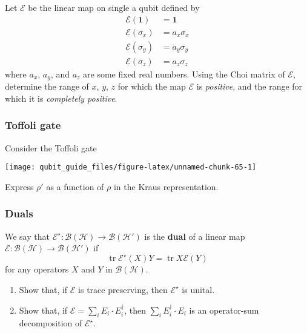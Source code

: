 \documentclass[fleqn]{article}
\providecommand{\tightlist}{%
  \setlength{\itemsep}{0pt}\setlength{\parskip}{0pt}}
\begin{document}
Let \(\mathcal{E}\) be the linear map on single a qubit defined by
\[
  \begin{aligned}
    \mathcal{E}(\mathbf{1})
    &= \mathbf{1}
  \\\mathcal{E}(\sigma_x)
    &= a_x\sigma_x
  \\\mathcal{E}(\sigma_y)
    &= a_y\sigma_y
  \\\mathcal{E}(\sigma_z)
    &= a_z\sigma_z
  \end{aligned}
\]
where \(a_x\), \(a_y\), and \(a_z\) are some fixed real numbers.
Using the Choi matrix of \(\mathcal{E}\), determine the range of \(x\), \(y\), \(z\) for which the map \(\mathcal{E}\) is \emph{positive}, and the range for which it is \emph{completely positive}.

\hypertarget{toffoli-gate}{%
\subsubsection{Toffoli gate}\label{toffoli-gate}}

Consider the Toffoli gate

\begin{center}\texttt{[image: qubit\_guide\_files/figure-latex/unnamed-chunk-65-1]} \end{center}

Express \(\rho'\) as a function of \(\rho\) in the Kraus representation.

\hypertarget{duals}{%
\subsubsection{Duals}\label{duals}}

We say that \(\mathcal{E}^\star\colon\mathcal{B}(\mathcal{H})\to\mathcal{B}(\mathcal{H}')\) is the \textbf{dual} of a linear map \(\mathcal{E}\colon\mathcal{B}(\mathcal{H})\to\mathcal{B}(\mathcal{H}')\) if
\[
  \operatorname{tr}\mathcal{E}^\star (X)Y = \operatorname{tr}X\mathcal{E}(Y)
\]
for any operators \(X\) and \(Y\) in \(\mathcal{B}(\mathcal{H})\).

\begin{enumerate}
\def\labelenumi{\arabic{enumi}.}
\tightlist
\item
  Show that, if \(\mathcal{E}\) is trace preserving, then \(\mathcal{E}^\star\) is unital.
\item
  Show that, if \(\mathcal{E}=\sum_i E_i\cdot E_i^\dagger\), then \(\sum_i E^\dagger_i\cdot E_i\) is an operator-sum decomposition of \(\mathcal{E}^\star\).
\end{enumerate}
\end{document}
